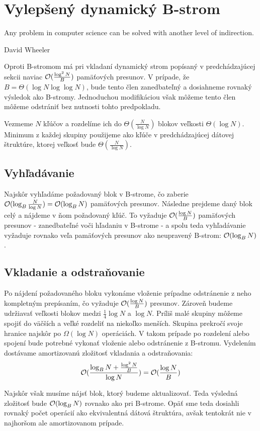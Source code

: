 \section{Vylepšený dynamický B-strom} \label{sec:dynamic-obliv-improved}
\epigraph{Any problem in computer science can be solved with another level of indirection.}{David Wheeler}
Oproti \aware B-stromom má pri vkladaní \obliv dynamický strom popísaný v predchádzajúcej sekcii naviac $\mathcal{O}(\frac{\log^2{N}}{B})$ pamäťových presunov. V prípade, že $B=\Theta(\log{N}\log\log{N})$, bude tento člen zanedbateľný a dosiahneme rovnaký výsledok ako \aware B-stromy. Jednoduchou modifikáciou však môžeme tento člen môžeme odstrániť bez nutnosti tohto predpokladu.

Vezmeme $N$ kľúčov a rozdelíme ich do $\Theta(\frac{N}{\log{N}})$ blokov veľkosti $\Theta(\log{N})$. Minimum z každej skupiny použijeme ako kľúče v predchádzajúcej dátovej štruktúre, ktorej veľkosť bude $\Theta(\frac{N}{\log{N}})$.

\subsection{Vyhľadávanie}
Najskôr vyhľadáme požadovaný blok v B-strome, čo zaberie $\mathcal{O}(\log_B{\frac{N}{\log{N}}}) = \mathcal{O}(\log_B{N})$ pamäťových presunov. Následne prejdeme daný blok celý a nájdeme v ňom požadovaný kľúč. To vyžaduje $\mathcal{O}(\frac{\log{N}}{B})$ pamäťových presunov - zanedbateľné voči hľadaniu v B-strome - a spolu teda vyhľadávanie vyžaduje rovnako veľa pamäťových presunov ako neupravený B-strom: $\mathcal{O}(\log_B{N})$.

\subsection{Vkladanie a odstraňovanie}
Po nájdení požadovaného bloku vykonáme vloženie prípadne odstránenie z neho kompletným prepísaním, čo vyžaduje $\mathcal{O}(\frac{\log{N}}{B})$ presunov. Zároveň budeme udržiavať veľkosti blokov medzi $\frac{1}{4}\log{N}$ a $\log{N}$. Príliš malé skupiny môžeme spojiť do väčších a veľké rozdeliť na niekoľko menších. Skupina prekročí svoje hranice najskôr po $\Omega(\log{N})$ operáciách. V takom prípade po rozdelení alebo spojení bude potrebné vykonať vloženie alebo odstránenie z B-stromu. Vydelením dostávame amortizovanú zložitosť vkladania a odstraňovania:
\[
\mathcal{O}(\frac{\log_B{N} + \frac{\log^2{N}}{B}}{\log{N}}) = \mathcal{O}(\frac{\log{N}}{B})
\]

Najskôr však musíme nájsť blok, ktorý budeme aktualizovať. Teda výsledná zložitosť bude $\mathcal{O}(\log_B{N})$ rovnako ako pri \aware B-strome. Opäť sme teda dosiahli rovnaký počet operácií ako ekvivalentná \aware dátová štruktúra, avšak tentokrát nie v najhoršom ale  amortizovanom prípade.




